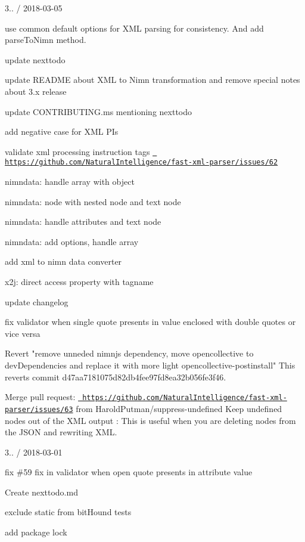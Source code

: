 3.. / 2018-\/03-\/05
\begin{DoxyItemize}
\item use common default options for XML parsing for consistency. And add {\ttfamily parse\+To\+Nimn} method.
\item update nexttodo
\item update README about XML to Nimn transformation and remove special notes about 3.\+x release
\item update CONTRIBUTING.\+ms mentioning nexttodo
\item add negative case for XML PIs
\item validate xml processing instruction tags \href{https://github.com/NaturalIntelligence/fast-xml-parser/issues/62}{\texttt{ https\+://github.\+com/\+Natural\+Intelligence/fast-\/xml-\/parser/issues/62}}
\item nimndata\+: handle array with object
\item nimndata\+: node with nested node and text node
\item nimndata\+: handle attributes and text node
\item nimndata\+: add options, handle array
\item add xml to nimn data converter
\item x2j\+: direct access property with tagname
\item update changelog
\item fix validator when single quote presents in value enclosed with double quotes or vice versa
\item Revert "{}remove unneded nimnjs dependency, move opencollective to dev\+Dependencies and replace it     with more light opencollective-\/postinstall"{} This reverts commit d47aa7181075d82db4fee97fd8ea32b056fe3f46.
\item Merge pull request\+: \href{https://github.com/NaturalIntelligence/fast-xml-parser/issues/63}{\texttt{ https\+://github.\+com/\+Natural\+Intelligence/fast-\/xml-\/parser/issues/63}} from Harold\+Putman/suppress-\/undefined Keep undefined nodes out of the XML output \+: This is useful when you are deleting nodes from the JSON and rewriting XML.
\end{DoxyItemize}

3.. / 2018-\/03-\/01
\begin{DoxyItemize}
\item fix \#59 fix in validator when open quote presents in attribute value
\item Create nexttodo.\+md
\item exclude static from bit\+Hound tests
\item add package lock
\end{DoxyItemize}

